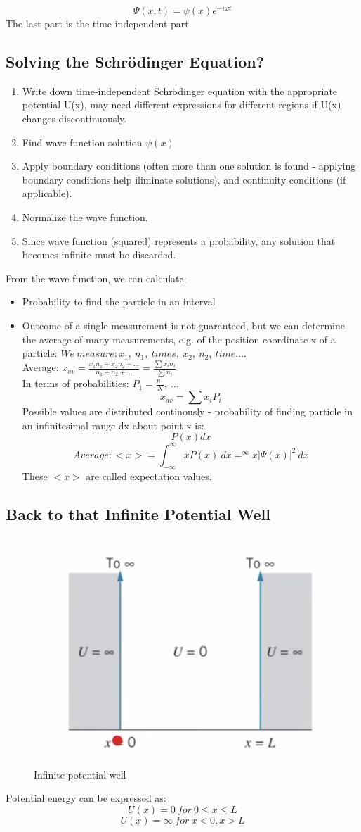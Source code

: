 \documentclass[class=article,crop=false]{standalone}
\begin{document}
$$\Psi(x,t) = \psi(x) e^{-i\omega t} $$
The last part is the time-independent part.

\subsection{Solving the Schrödinger Equation?}
\begin{enumerate}
	\item	Write down time-independent Schrödinger equation with the appropriate potential U(x), may need different expressions for different regions if U(x) changes discontinuously.
	\item 	Find wave function solution $\psi(x)$
	\item 	Apply boundary conditions (often more than one solution is found - applying boundary conditions help iliminate solutions), and continuity conditions (if applicable).
	\item 	Normalize the wave function.
	\item 	Since wave function (squared) represents a probability, any solution that becomes infinite must be discarded.
\end{enumerate}

From the wave function, we can calculate:
\begin{itemize}
	\item Probability to find the particle in an interval
	\item Outcome of a single measurement is not guaranteed, but we can determine the average of many measurements, e.g. of the position coordinate x of a particle:
		$ We\ measure: x_1,\ n_1,\ times,\ x_2,\ n_2,\ time.... $ \\
		Average: $x_{av} = \frac{x_1n_1 + x_2n_2 + ...}{n_1 + n_2 + ...} = \frac{\sum x_in_i}{\sum n_i} $\\
		In terms of probabilities: $P_1 = \frac{n_1}{N},\ ...$
		$$x_{av} = \sum x_iP_i $$
		Possible values are distributed continously - probability of finding particle in an infinitesimal range dx about point x is:
		$$ P(x)dx $$
		$$ Average: <x> = \int_{-\infty}^{\infty} x P(x)\ dx = ^{\infty} x |\Psi(x)|^2\ dx $$
		These $<x>$ are called expectation values.
\end{itemize}

\newpage
\subsection{Back to that Infinite Potential Well}

\begin{figure}[h!]
	\centering
	\includegraphics[width=.4\linewidth]{./Images/well.png}
	\caption{Infinite potential well}
\end{figure}
Potential energy can be expressed as:
$$ U(x) = 0\ for\ 0\leq x \leq L $$
$$ U(x) = \infty\ for\ x < 0, x > L $$
\end{document}
